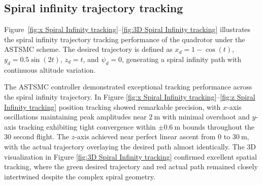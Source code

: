 
\subsection{Spiral infinity trajectory tracking}
\noindent
Figure~\ref{fig:x Spiral Infinity tracking}--\ref{fig:3D Spiral Infinity tracking} illustrates the spiral infinity trajectory tracking performance of the quadrotor under the ASTSMC scheme. The desired trajectory is defined as $x_d = 1 - \cos(t)$, $y_d = 0.5\sin(2t)$, $z_d = t$, and $\psi_d = 0$, generating a spiral infinity path with continuous altitude variation. %





The ASTSMC controller demonstrated exceptional tracking performance across the spiral infinity trajectory. In Figure \ref{fig:x Spiral Infinity tracking}--\ref{fig:z Spiral Infinity tracking}  position tracking showed remarkable precision, with $x$-axis oscillations maintaining peak amplitudes near $2~\text{m}$ with minimal overshoot and $y$-axis tracking exhibiting tight convergence within $\pm 0.6~\text{m}$ bounds throughout the 30 second flight. The $z$-axis achieved near perfect linear ascent from $0$ to $30~\text{m}$, with the actual trajectory overlaying the desired path almost identically. The 3D visualization in Figure \ref{fig:3D Spiral Infinity tracking} confirmed excellent spatial tracking, where the green desired trajectory and red actual path remained closely intertwined despite the complex spiral geometry.

